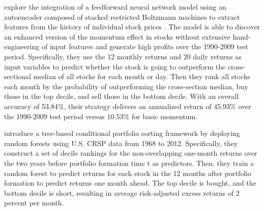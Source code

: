 \documentclass{article}
\begin{document}
\cite{takeuchi2013applying} explore the integration of a feedforward neural network model using an autoencoder composed of stacked restricted Boltzmann machines to extract features from the history of individual stock prices . The model is able to discover an enhanced version of the momentum effect in stocks without extensive hand-engineering of input features and generate high profits over the 1990-2009 test period. Specifically, they use the 12 monthly returns and 20 daily returns as input variables to predict whether the stock is going to outperform the cross-sectional median of all stocks for each month or day. Then they rank all stocks each month by the probability of outperforming the cross-section median, buy those in the top decile, and sell those in the bottom decile. With an overall accuracy of 53.84\%, their strategy delivers an annualized return of 45.93\% over the 1990-2009 test period versus 10.53\% for basic momentum.

\cite{moritz2016tree} introduce a tree-based conditional portfolio sorting framework by deploying random forests using U.S. CRSP data from 1968 to 2012. Specifically, they construct a set of decile rankings for the non-overlapping one-month returns over the two years before portfolio formation time t as predictors. Then, they train a random forest to predict returns for each stock in the 12 months after portfolio formation to predict returns one month ahead. The top decile is bought, and the bottom decile is short, resulting in average risk-adjusted excess returns of 2 percent per month.
\end{document}
